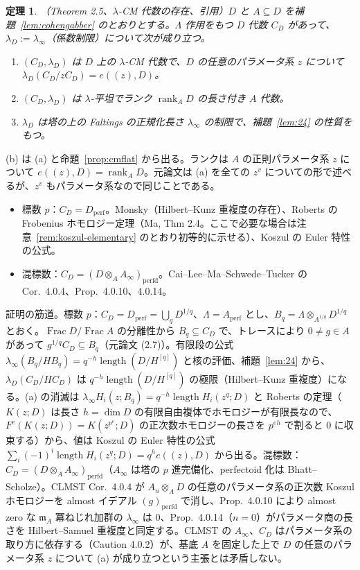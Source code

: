 \documentclass[11pt,a4paper]{ltjsarticle}
\numberwithin{equation}{section}
\theoremstyle{plain}
\newtheorem{theorem}{定理}[section]
\theoremstyle{definition}
\theoremstyle{definition}
\newcommand{\orig}[1]{（#1）}
\newcommand{\m}{\mathfrak{m}}
\newcommand{\len}{\operatorname{length}}
\newcommand{\rank}{\operatorname{rank}}
\newcommand{\Frac}{\operatorname{Frac}}
\begin{document}
\begin{theorem}\orig{Theorem 2.5、$\lambda$-CM 代数の存在、引用}\label{thm:existence}
$D$ と $A\subseteq D$ を補題~\ref{lem:cohengabber} のとおりとする。$\Lambda$ 作用をもつ $D$ 代数 $C_D$ があって、$\lambda_D := \lambda_\infty$（係数制限）について次が成り立つ。
\begin{enumerate}[label=(\alph*)]
  \item $(C_D,\lambda_D)$ は $D$ 上の $\lambda$-CM 代数で、$D$ の任意のパラメータ系 $z$ について $\lambda_D(C_D/zC_D) = e((z), D)$。
  \item $(C_D,\lambda_D)$ は $\lambda$-平坦でランク $\rank_A D$ の長さ付き $A$ 代数。
  \item $\lambda_D$ は塔の上の Faltings の正規化長さ $\lambda_\infty$ の制限で、補題~\ref{lem:24} の性質をもつ。
\end{enumerate}
\end{theorem}
(b) は (a) と命題~\ref{prop:cmflat} から出る。ランクは $A$ の正則パラメータ系 $z$ について $e((z),D) = \rank_A D$。元論文は (a) を全ての $z^v$ についての形で述べるが、$z^v$ もパラメータ系なので同じことである。
\begin{itemize}
  \item 標数 $p$：$C_D = D_{\mathrm{perf}}$。Monsky（Hilbert--Kunz 重複度の存在）、Roberts の Frobenius ホモロジー定理（Ma, Thm 2.4。ここで必要な場合は注意~\ref{rem:koszul-elementary} のとおり初等的に示せる）、Koszul の Euler 特性の公式。
  \item 混標数：$C_D = (D\otimes_A A_\infty)_{\mathrm{perfd}}$。Cai--Lee--Ma--Schwede--Tucker の Cor.~4.0.4、Prop.~4.0.10、4.0.14。
\end{itemize}
証明の筋道。標数 $p$：$C_D=D_{\mathrm{perf}}=\bigcup_qD^{1/q}$、$\Lambda=A_{\mathrm{perf}}$ とし、$B_q=\Lambda\otimes_{A^{1/q}}D^{1/q}$ とおく。$\Frac D/\Frac A$ の分離性から $B_q\subseteq C_D$ で、トレースにより $0\ne g\in A$ があって $g^{1/q}C_D\subseteq B_q$（元論文 (2.7)）。有限段の公式 $\lambda_\infty(B_q/HB_q)=q^{-h}\len(D/H^{[q]})$ と核の評価、補題~\ref{lem:24} から、$\lambda_D(C_D/HC_D)$ は $q^{-h}\len(D/H^{[q]})$ の極限（Hilbert--Kunz 重複度）になる。(a) の消滅は $\lambda_\infty H_i(z;B_q)=q^{-h}\len H_i(z^q;D)$ と Roberts の定理（$K(z;D)$ は長さ $h=\dim D$ の有限自由複体でホモロジーが有限長なので、$F^e(K(z;D))=K(z^{p^e};D)$ の正次数ホモロジーの長さを $p^{eh}$ で割ると $0$ に収束する）から、値は Koszul の Euler 特性の公式 $\sum_i(-1)^i\len H_i(z^q;D)=q^he((z),D)$ から出る。混標数：$C_D=(D\otimes_AA_\infty)_{\mathrm{perfd}}$（$A_\infty$ は塔の $p$ 進完備化、perfectoid 化は Bhatt--Scholze）。CLMST Cor.~4.0.4 が $A_n\otimes_AD$ の任意のパラメータ系の正次数 Koszul ホモロジーを almost イデアル $(g)_{\mathrm{perfd}}$ で消し、Prop.~4.0.10 により almost zero な $\m_A$ 冪ねじれ加群の $\lambda_\infty$ は $0$、Prop.~4.0.14（$n=0$）がパラメータ商の長さを Hilbert--Samuel 重複度と同定する。CLMST の $A_\infty$、$C_D$ はパラメータ系の取り方に依存する（Caution 4.0.2）が、基底 $A$ を固定した上で $D$ の任意のパラメータ系 $z$ について (a) が成り立つという主張とは矛盾しない。
\end{document}
